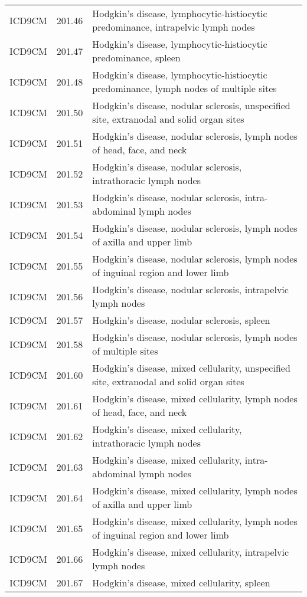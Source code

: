 \begin{longtable}{p{}p{}p{}}
  ICD9CM & 201.46 & Hodgkin's disease, lymphocytic-histiocytic predominance, intrapelvic lymph nodes \\ 
  ICD9CM & 201.47 & Hodgkin's disease, lymphocytic-histiocytic predominance, spleen \\ 
  ICD9CM & 201.48 & Hodgkin's disease, lymphocytic-histiocytic predominance, lymph nodes of multiple sites \\ 
  ICD9CM & 201.50 & Hodgkin's disease, nodular sclerosis, unspecified site, extranodal and solid organ sites \\ 
  ICD9CM & 201.51 & Hodgkin's disease, nodular sclerosis, lymph nodes of head, face, and neck \\ 
  ICD9CM & 201.52 & Hodgkin's disease, nodular sclerosis, intrathoracic lymph nodes \\ 
  ICD9CM & 201.53 & Hodgkin's disease, nodular sclerosis, intra-abdominal lymph nodes \\ 
  ICD9CM & 201.54 & Hodgkin's disease, nodular sclerosis, lymph nodes of axilla and upper limb \\ 
  ICD9CM & 201.55 & Hodgkin's disease, nodular sclerosis, lymph nodes of inguinal region and lower limb \\ 
  ICD9CM & 201.56 & Hodgkin's disease, nodular sclerosis, intrapelvic lymph nodes \\ 
  ICD9CM & 201.57 & Hodgkin's disease, nodular sclerosis, spleen \\ 
  ICD9CM & 201.58 & Hodgkin's disease, nodular sclerosis, lymph nodes of multiple sites \\ 
  ICD9CM & 201.60 & Hodgkin's disease, mixed cellularity, unspecified site, extranodal and solid organ sites \\ 
  ICD9CM & 201.61 & Hodgkin's disease, mixed cellularity, lymph nodes of head, face, and neck \\ 
  ICD9CM & 201.62 & Hodgkin's disease, mixed cellularity, intrathoracic lymph nodes \\ 
  ICD9CM & 201.63 & Hodgkin's disease, mixed cellularity, intra-abdominal lymph nodes \\ 
  ICD9CM & 201.64 & Hodgkin's disease, mixed cellularity, lymph nodes of axilla and upper limb \\ 
  ICD9CM & 201.65 & Hodgkin's disease, mixed cellularity, lymph nodes of inguinal region and lower limb \\ 
  ICD9CM & 201.66 & Hodgkin's disease, mixed cellularity, intrapelvic lymph nodes \\ 
  ICD9CM & 201.67 & Hodgkin's disease, mixed cellularity, spleen \\ 

\end{longtable}
